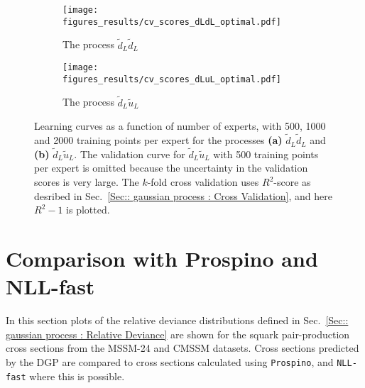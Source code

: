 \documentclass[twoside,english]{uiofysmaster}
\begin{document}
\begin{figure}
    \centering
    \begin{subfigure}[b]{0.7\textwidth}
        \texttt{[image: figures\_results/cv\_scores\_dLdL\_optimal.pdf]}
        \caption{The process $\widetilde{d}_L \widetilde{d}_L$}
        \label{Fig:: results : Learning curves dLdL}
    \end{subfigure}
    \begin{subfigure}[b]{0.7\textwidth}
        \texttt{[image: figures\_results/cv\_scores\_dLuL\_optimal.pdf]}
        \caption{The process $\widetilde{d}_L \widetilde{u}_L$}
        \label{Fig :: results : Learning curves dLuL}
    \end{subfigure}
    \caption{Learning curves as a function of number of experts, with 500, 1000 and 2000 training points per expert for the processes \textbf{(a)} $\widetilde{d}_L \widetilde{d}_L$ and \textbf{(b)} $\widetilde{d}_L\widetilde{u}_L$. The validation curve for $\widetilde{d}_L \widetilde{u}_L$ with 500 training points per expert is omitted because the uncertainty in the validation scores is very large. The $k$-fold cross validation uses $R^2$-score as desribed in Sec.~\ref{Sec:: gaussian process : Cross Validation}, and here $R^2-1$ is plotted.}
\label{Fig:: results : Learning curves}
\end{figure}


\section{Comparison with Prospino and NLL-fast}

In this section plots of the relative deviance distributions defined in Sec.~\ref{Sec:: gaussian process : Relative Deviance} are shown for the squark pair-production cross sections from the MSSM-24 and CMSSM datasets. Cross sections predicted by the DGP are compared to cross sections calculated using \verb|Prospino|, and \verb|NLL-fast| where this is possible.
\end{document}
